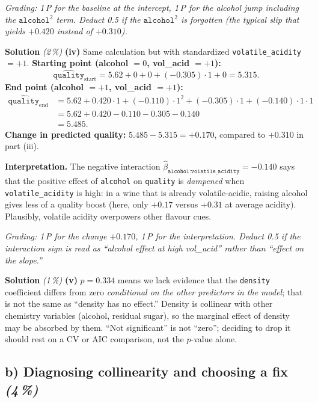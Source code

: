 \documentclass[11pt,a4paper]{article}
\newcommand{\subpoints}[1]{\textit{(#1\,\%)}}
\newcommand{\sol}{\noindent\textbf{Solution}}
\begin{document}
\noindent\emph{Grading: 1\,P for the baseline at the intercept, 1\,P for the alcohol jump including
the $\texttt{alcohol}^2$ term. Deduct 0.5 if the $\texttt{alcohol}^2$ is forgotten (the typical slip
that yields $+0.420$ instead of $+0.310$).}

\medskip
\sol{} \subpoints{2} \textbf{(iv)} Same calculation but with standardized \texttt{volatile\_acidity}
$ = +1$.
\textbf{Starting point (alcohol $= 0$, vol\_acid $= +1$):}
$$\widehat{\texttt{quality}}_{\text{start}} = 5.62 + 0 + 0 + (-0.305)\cdot 1 + 0 = 5.315.$$
\textbf{End point (alcohol $= +1$, vol\_acid $= +1$):}
\begin{align*}
\widehat{\texttt{quality}}_{\text{end}}
   &= 5.62 + 0.420\cdot 1 + (-0.110)\cdot 1^2 + (-0.305)\cdot 1 + (-0.140)\cdot 1\cdot 1 \\
   &= 5.62 + 0.420 - 0.110 - 0.305 - 0.140 \\
   &= 5.485.
\end{align*}
\textbf{Change in predicted quality:} $5.485 - 5.315 = \boxed{+0.170}$, compared to $+0.310$ in
part (iii).

\textbf{Interpretation.} The negative interaction $\hat\beta_{\texttt{alcohol:volatile\_acidity}}=-0.140$
says that the positive effect of \texttt{alcohol} on \texttt{quality} is \emph{dampened} when
\texttt{volatile\_acidity} is high: in a wine that is already volatile-acidic, raising alcohol
gives less of a quality boost (here, only $+0.17$ versus $+0.31$ at average acidity). Plausibly,
volatile acidity overpowers other flavour cues.

\noindent\emph{Grading: 1\,P for the change $+0.170$, 1\,P for the interpretation. Deduct 0.5 if
the interaction sign is read as ``alcohol effect at high vol\_acid'' rather than ``effect on
the slope.''}

\medskip
\sol{} \subpoints{1} \textbf{(v)} $p = 0.334$ means we lack evidence that the \texttt{density}
coefficient differs from zero \emph{conditional on the other predictors in the model}; that is not
the same as ``density has no effect.'' Density is collinear with other chemistry variables
(alcohol, residual sugar), so the marginal effect of density may be absorbed by them. ``Not
significant'' is not ``zero''; deciding to drop it should rest on a CV or AIC comparison, not the
$p$-value alone.

\subsection*{b) Diagnosing collinearity and choosing a fix \subpoints{4}}
\end{document}
